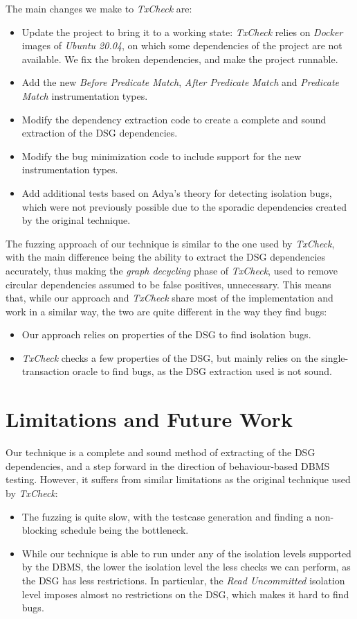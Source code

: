 The main changes we make to \textit{TxCheck} are:
\begin{itemize}
    \item Update the project to bring it to a working state: \textit{TxCheck} relies on \textit{Docker} images of \textit{Ubuntu 20.04}, on which some dependencies of the project are not available. We fix the broken dependencies, and make the project runnable.
    \item Add the new \textit{Before Predicate Match}, \textit{After Predicate Match} and \textit{Predicate Match} instrumentation types.
    \item Modify the dependency extraction code to create a complete and sound extraction of the DSG dependencies.
    \item Modify the bug minimization code to include support for the new instrumentation types.
    \item Add additional tests based on Adya's theory \cite{adya1999weak} for detecting isolation bugs, which were not previously possible due to the sporadic dependencies created by the original technique.
\end{itemize}

The fuzzing approach of our technique is similar to the one used by \textit{TxCheck}, with the main difference being the ability to extract the DSG dependencies accurately, thus making the \textit{graph decycling} phase of \textit{TxCheck}, used to remove circular dependencies assumed to be false positives, unnecessary. This means that, while our approach and \textit{TxCheck} share most of the implementation and work in a similar way, the two are quite different in the way they find bugs:
\begin{itemize}
    \item Our approach relies on properties of the DSG to find isolation bugs.
    \item \textit{TxCheck} checks a few properties of the DSG, but mainly relies on the single-transaction oracle to find bugs, as the DSG extraction used is not sound.
\end{itemize}

\section{Limitations and Future Work}

Our technique is a complete and sound method of extracting of the DSG dependencies, and a step forward in the direction of behaviour-based DBMS testing. However, it suffers from similar limitations as the original technique used by \textit{TxCheck}:
\begin{itemize}
    \item The fuzzing is quite slow, with the testcase generation and finding a non-blocking schedule being the bottleneck.
    \item While our technique is able to run under any of the isolation levels supported by the DBMS, the lower the isolation level the less checks we can perform, as the DSG has less restrictions. In particular, the \textit{Read Uncommitted} isolation level imposes almost no restrictions on the DSG, which makes it hard to find bugs.
\end{itemize}

